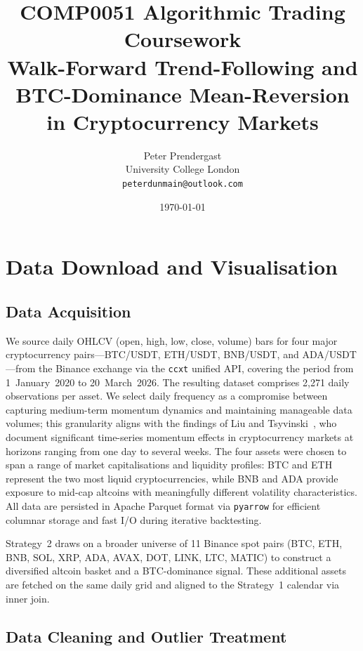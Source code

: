 \documentclass[11pt,a4paper]{article}
\title{\textbf{COMP0051 Algorithmic Trading Coursework}\\[4pt]
       \large Walk-Forward Trend-Following and BTC-Dominance Mean-Reversion\\
       in Cryptocurrency Markets}
\author{Peter Prendergast\\
        University College London\\
        \texttt{peterdunmain@outlook.com}}
\date{\today}
\begin{document}
\maketitle
\thispagestyle{empty}

\section{Data Download and Visualisation}
\label{sec:data}

\subsection{Data Acquisition}

We source daily OHLCV (open, high, low, close, volume) bars for four major cryptocurrency pairs---BTC/USDT, ETH/USDT, BNB/USDT, and ADA/USDT---from the Binance exchange via the \texttt{ccxt} unified API, covering the period from 1~January~2020 to 20~March~2026.  The resulting dataset comprises 2{,}271 daily observations per asset.  We select daily frequency as a compromise between capturing medium-term momentum dynamics and maintaining manageable data volumes; this granularity aligns with the findings of Liu and Tsyvinski~\cite{liu2021}, who document significant time-series momentum effects in cryptocurrency markets at horizons ranging from one day to several weeks.  The four assets were chosen to span a range of market capitalisations and liquidity profiles: BTC and ETH represent the two most liquid cryptocurrencies, while BNB and ADA provide exposure to mid-cap altcoins with meaningfully different volatility characteristics.  All data are persisted in Apache Parquet format via \texttt{pyarrow} for efficient columnar storage and fast I/O during iterative backtesting.

Strategy~2 draws on a broader universe of 11 Binance spot pairs (BTC, ETH, BNB, SOL, XRP, ADA, AVAX, DOT, LINK, LTC, MATIC) to construct a diversified altcoin basket and a BTC-dominance signal.  These additional assets are fetched on the same daily grid and aligned to the Strategy~1 calendar via inner join.

\subsection{Data Cleaning and Outlier Treatment}
\end{document}

